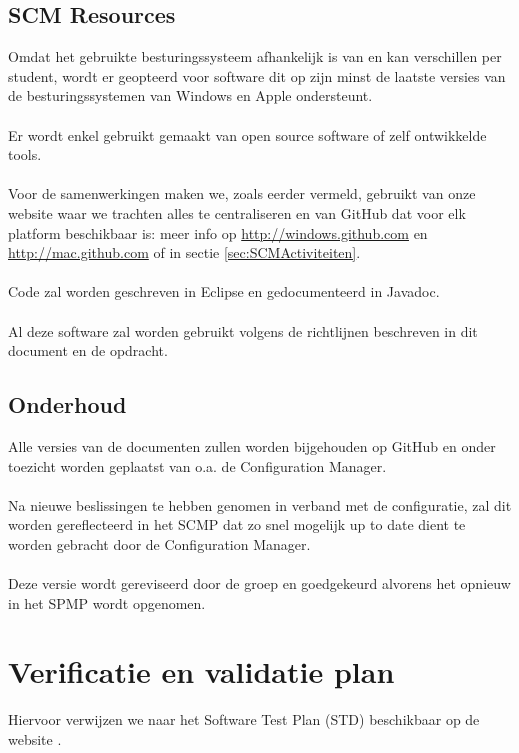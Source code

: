 \subsection{SCM Resources}
Omdat het gebruikte besturingssysteem afhankelijk is van en kan verschillen per student, wordt er geopteerd voor software dit op zijn minst de laatste versies van de besturingssystemen van Windows en Apple ondersteunt.
\\
\\
Er wordt enkel gebruikt gemaakt van open source software of zelf ontwikkelde tools.
\\
\\
Voor de samenwerkingen maken we, zoals eerder vermeld, gebruikt van onze website waar we trachten alles te centraliseren en van GitHub dat voor elk platform beschikbaar is: meer info op \url{http://windows.github.com} en \url{http://mac.github.com} of in sectie \ref{sec:SCMActiviteiten}.
\\
\\
Code zal worden geschreven in Eclipse\cite{Eclipse} en gedocumenteerd in Javadoc\cite{Javadoc}.
\\
\\
Al deze software zal worden gebruikt volgens de richtlijnen beschreven in dit document en de opdracht.

\subsection{Onderhoud}
Alle versies van de documenten zullen worden bijgehouden op GitHub en onder toezicht worden geplaatst van o.a. de Configuration Manager.
\\
\\
Na nieuwe beslissingen te hebben genomen in verband met de configuratie, zal dit worden gereflecteerd in het SCMP dat zo snel mogelijk up to date dient te worden gebracht door de Configuration Manager.
\\
\\
Deze versie wordt gereviseerd door de groep en goedgekeurd alvorens het opnieuw in het SPMP wordt opgenomen.

\section{Verificatie en validatie plan}
Hiervoor verwijzen we naar het Software Test Plan (STD) beschikbaar op de website \cite{portalWebsite}.

